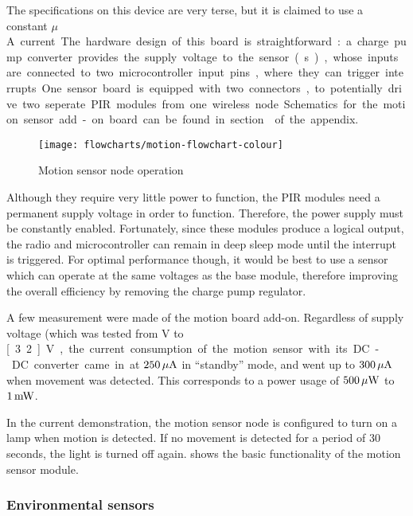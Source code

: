 The specifications on this device are very terse, but it is claimed to use a
constant \unit[50]{$\mu$A} current.

The hardware design of this board is straightforward : a charge pump converter
provides the supply voltage to the sensor(s), whose inputs are connected to two
microcontroller input pins, where they can trigger interrupts. One sensor board
is equipped with two connectors, to potentially drive two seperate PIR modules
from one wireless node. Schematics for the motion sensor add-on board can be
found in section  of the appendix.

\begin{figure}[!h]
  \begin{center}
    \texttt{[image: flowcharts/motion-flowchart-colour]}
  \end{center}
  \caption{Motion sensor node operation}
  \label{fig:motion-flowchart}
\end{figure}

Although they require very little power to function, the PIR modules need a
permanent supply voltage in order to function. Therefore, the power supply must
be constantly enabled. Fortunately, since these modules produce a logical
output, the radio and microcontroller can remain in deep sleep mode until the
interrupt is triggered. For optimal performance though, it would be best to use
a sensor which can operate at the same voltages as the base module, therefore
improving the overall efficiency by removing the charge pump regulator.

A few measurement were made of the motion board add-on. Regardless of supply
voltage (which was tested from \unit[2]{V} to \unit[3.2]{V}, the current
consumption of the motion sensor with its DC-DC converter came in at
$\unit[250]{\mu{}A}$ in ``standby'' mode, and went up to
$\unit[300]{\mu{}A}$ when movement was detected. This corresponds to a power
usage of $\unit[500]{\mu{}W}$ to $\unit[1]{mW}$.

In the current demonstration, the motion sensor node is configured to turn on a
lamp when motion is detected. If no movement is detected for a period of 30
seconds, the light is turned off again.  shows the
basic functionality of the motion sensor module.

\subsubsection{Environmental sensors}


